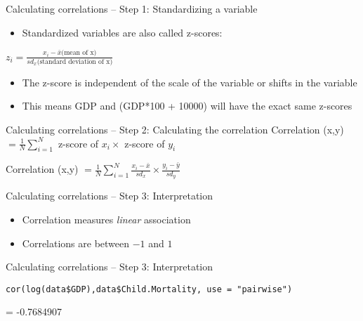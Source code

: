 \documentclass[presentation]{beamer}
\begin{document}
\begin{frame}[label={sec:org3bfe001}]{Calculating correlations -- Step 1: Standardizing a variable}
\begin{itemize}
\item Standardized variables are also called z-scores:
\end{itemize}
\(z_{i} = \frac{x_{i} - \bar{x} \text{(mean of x)}}{sd_{x} \text{(standard deviation of x)}}\)

\begin{itemize}
\item The z-score is independent of the scale of the variable or shifts in the variable
\end{itemize}
\pause

\begin{itemize}
\item This means GDP and (GDP*100 + 10000) will have the exact same z-scores
\end{itemize}
\end{frame}

\begin{frame}[label={sec:org6e9f410}]{Calculating correlations -- Step 2: Calculating the correlation}
Correlation (x,y) \(= \frac{1}{N} \sum^{N}_{i=1}\) z-score of \(x_i \times\) z-score of \(y_{i}\)

\pause

Correlation (x,y) \(= \frac{1}{N} \sum^{N}_{i=1} \frac{x_{i} - \bar{x}}{sd_{x}} \times   \frac{y_{i} - \bar{y}}{sd_{y}}\)
\end{frame}

\begin{frame}[label={sec:org3d4f517}]{Calculating correlations -- Step 3: Interpretation}
\begin{itemize}
\item Correlation measures \emph{linear} association
\item Correlations are between \(-1\) and \(1\)
\end{itemize}
\end{frame}

\begin{frame}[fragile,label={sec:org35ffccc}]{Calculating correlations -- Step 3: Interpretation}
 \begin{verbatim}
cor(log(data$GDP),data$Child.Mortality, use = "pairwise")
\end{verbatim}

= -0.7684907
\end{frame}
\end{document}
